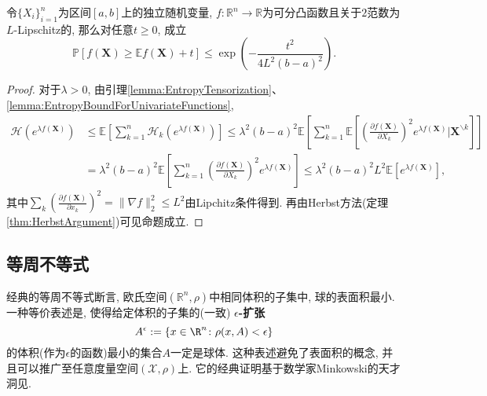 \begin{proposition}
	令$\{X_i\}_{i=1}^n$为区间$[a, b]$上的独立随机变量, $f \colon \mathbb{R}^n \to \mathbb{R}$为可分凸函数且关于$2$范数为$L$-Lipschitz的, 那么对任意$t \geq 0$, 成立
	\begin{equation*}
		\mathbb{P}[f(\bm{X}) \geq \mathbb{E}f(\bm{X}) + t] 
		\leq \exp \left( - \frac{t^2}{4L^2 (b-a)^2} \right). 
	\end{equation*}	
\end{proposition}
\begin{proof}
	对于$\lambda > 0$, 由引理\ref{lemma:EntropyTensorization}、 \ref{lemma:EntropyBoundForUnivariateFunctions}, 
	\begin{align*}
		\mathcal{H}(e^{\lambda f(\bm{X})})
		&\leq \mathbb{E}\left[ \sum_{k=1}^n \mathcal{H}_k (e^{\lambda f(\bm{X})}) \right]
		\leq \lambda^2 (b-a)^2  \mathbb{E}\left[ \sum_{k=1}^n \mathbb{E}\left[ \left(\frac{\partial f(\bm{X})}{\partial X_k} \right)^2 e^{\lambda f(\bm{X})} \bigg| \bm{X}^{\backslash k} \right] \right] \\
		&= \lambda^2 (b-a)^2  \mathbb{E}\left[ \sum_{k=1}^n \left(\frac{\partial f(\bm{X})}{\partial X_k} \right)^2 e^{\lambda f(\bm{X})}\right]
		\leq \lambda^2 (b-a)^2 L^2 \mathbb{E}[e^{\lambda f(\bm{X})}], 
	\end{align*}
	其中$\sum_k \left( \frac{\partial f(\bm{X})}{\partial x_k} \right)^2 = \|\nabla f\|_2^2 \leq L^2$由Lipchitz条件得到. 
	再由Herbst方法(定理\ref{thm:HerbstArgument})可见命题成立. 
\end{proof}



\subsection{等周不等式}

经典的等周不等式断言, 欧氏空间$(\mathbb{R}^n, \rho)$中相同体积的子集中, 球的表面积最小. 
一种等价表述是, 使得给定体积的子集的(一致) \textbf{$\epsilon$-扩张}
\begin{equation*}
	A^{\epsilon} := \left\{ x \in \R^n \colon \rho(x, A) < \epsilon \right\}
\end{equation*}
的体积(作为$\epsilon$的函数)最小的集合$A$一定是球体.  
这种表述避免了表面积的概念, 并且可以推广至任意度量空间$(\mathcal{X}, \rho)$上. 
它的经典证明基于数学家Minkowski的天才洞见. 

